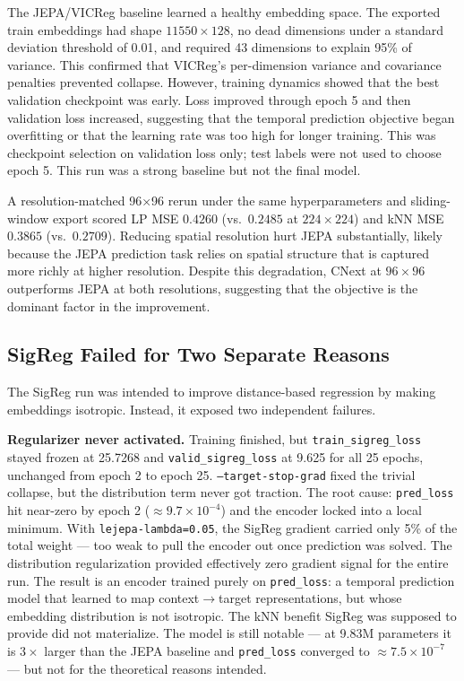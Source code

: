 \documentclass{article}
\begin{document}
The JEPA/VICReg baseline learned a healthy embedding space. The exported train embeddings had shape $11550\times128$, no dead dimensions under a standard deviation threshold of 0.01, and required 43 dimensions to explain 95\% of variance. This confirmed that VICReg's per-dimension variance and covariance penalties prevented collapse. However, training dynamics showed that the best validation checkpoint was early. Loss improved through epoch 5 and then validation loss increased, suggesting that the temporal prediction objective began overfitting or that the learning rate was too high for longer training. This was checkpoint selection on validation loss only; test labels were not used to choose epoch 5. This run was a strong baseline but not the final model.

A resolution-matched 96×96 rerun under the same hyperparameters and sliding-window export scored LP MSE $0.4260$ (vs.\ $0.2485$ at $224\times224$) and kNN MSE $0.3865$ (vs.\ $0.2709$). Reducing spatial resolution hurt JEPA substantially, likely because the JEPA prediction task relies on spatial structure that is captured more richly at higher resolution. Despite this degradation, CNext at $96\times96$ outperforms JEPA at both resolutions, suggesting that the objective is the dominant factor in the improvement.

\subsection{SigReg Failed for Two Separate Reasons}

The SigReg run was intended to improve distance-based regression by making embeddings isotropic. Instead, it exposed two independent failures.

\textbf{Regularizer never activated.} Training finished, but \texttt{train\_sigreg\_loss} stayed frozen at 25.7268 and \texttt{valid\_sigreg\_loss} at 9.625 for all 25 epochs, unchanged from epoch 2 to epoch 25. \texttt{--target-stop-grad} fixed the trivial collapse, but the distribution term never got traction. The root cause: \texttt{pred\_loss} hit near-zero by epoch 2 (${\approx}9.7\times10^{-4}$) and the encoder locked into a local minimum. With \texttt{lejepa-lambda=0.05}, the SigReg gradient carried only 5\% of the total weight --- too weak to pull the encoder out once prediction was solved. The distribution regularization provided effectively zero gradient signal for the entire run. The result is an encoder trained purely on \texttt{pred\_loss}: a temporal prediction model that learned to map context$\to$target representations, but whose embedding distribution is not isotropic. The kNN benefit SigReg was supposed to provide did not materialize. The model is still notable --- at 9.83M parameters it is $3\times$ larger than the JEPA baseline and \texttt{pred\_loss} converged to ${\approx}7.5\times10^{-7}$ --- but not for the theoretical reasons intended.
\end{document}
